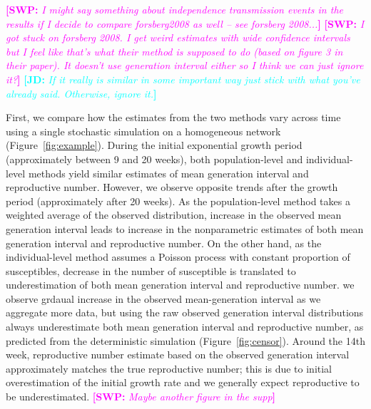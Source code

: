 \documentclass[12pt]{article}
\newcommand{\comment}[3]{\textcolor{#1}{\textbf{[#2: }\textsl{#3}\textbf{]}}}
\newcommand{\jd}[1]{\comment{cyan}{JD}{#1}}
\newcommand{\swp}[1]{\comment{magenta}{SWP}{#1}}
\begin{document}
\swp{I might say something about independence transmission events in the results if I decide to compare forsberg2008 as well -- see forsberg 2008...}
\swp{I got stuck on forsberg 2008. I get weird estimates with wide confidence intervals but I feel like that's what their method is supposed to do (based on figure 3 in their paper). It doesn't use generation interval either so I think we can just ignore it?}
\jd{If it really is similar in some important way just stick with what you've already said. Otherwise, ignore it.}

First, we compare how the estimates from the two methods vary across time using a single stochastic simulation on a homogeneous network (Figure~\ref{fig:example}).
During the initial exponential growth period (approximately between 9 and 20 weeks), both population-level and individual-level methods yield similar estimates of mean generation interval and reproductive number.
However, we observe opposite trends after the growth period (approximately after 20 weeks).
As the population-level method takes a weighted average of the observed distribution, increase in the observed mean generation interval leads to increase in the nonparametric estimates of both mean generation interval and reproductive number.
On the other hand, as the individual-level method assumes a Poisson process with constant proportion of susceptibles, decrease in the number of susceptible is translated to underestimation of both mean generation interval and reproductive number.
we observe grdaual increase in the observed mean-generation interval as we aggregate more data, but using the raw observed generation interval distributions always underestimate both mean generation interval and reproductive number, as predicted from the deterministic simulation (Figure~\ref{fig:censor}).
Around the 14th week, reproductive number estimate based on the observed generation interval approximately matches the true reproductive number; this is due to initial overestimation of the initial growth rate and we generally expect reproductive to be underestimated. \swp{Maybe another figure in the supp}
\end{document}
